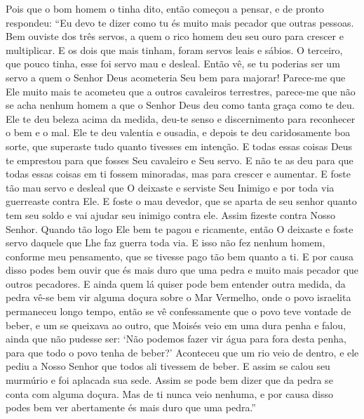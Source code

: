 Pois que o bom homem o tinha dito, então começou a pensar, e de pronto
respondeu: “Eu devo te dizer como tu és muito mais pecador que outras pessoas.
Bem ouviste dos três servos, a quem o rico homem deu seu ouro para crescer e
multiplicar. E os dois que mais tinham, foram servos leais e sábios. O
terceiro, que pouco tinha, esse foi servo mau e desleal. Então vê, se tu
poderias ser um servo a quem o Senhor Deus acometeria Seu bem para majorar!
Parece-me que Ele muito mais te acometeu que a outros cavaleiros terrestres,
parece-me que não se acha nenhum homem a que o Senhor Deus deu como tanta graça
como te deu. Ele te deu beleza acima da medida, deu-te senso e discernimento
para reconhecer o bem e o mal. Ele te deu valentia e ousadia, e depois te deu
caridosamente boa sorte, que superaste tudo quanto tivesses em intenção. 
E todas essas coisas Deus te emprestou para que fosses Seu
cavaleiro e Seu servo. E não te as deu para que todas essas coisas em ti fossem
minoradas, mas para crescer e aumentar. E foste tão mau servo e desleal que O
deixaste e serviste Seu Inimigo e por toda via guerreaste contra Ele. E foste o
mau devedor, que se aparta de seu senhor quanto tem seu soldo e vai ajudar seu
inimigo contra ele. Assim fizeste contra Nosso Senhor. Quando tão logo Ele bem
te pagou e ricamente, então O deixaste e foste servo daquele que Lhe faz guerra
toda via. E isso não fez nenhum homem, conforme meu pensamento, que se tivesse
pago tão bem quanto a ti. E por causa disso podes bem ouvir que és mais duro
que uma pedra e muito mais pecador que outros pecadores. E ainda quem lá quiser
pode bem entender outra medida, da pedra vê-se bem vir alguma doçura sobre o
Mar Vermelho, onde o povo israelita permaneceu longo tempo, então se vê
confessamente que o povo teve vontade de beber, e um se queixava ao outro, que
Moisés veio em uma dura penha e falou, ainda que não pudesse ser: ‘Não podemos
fazer vir água para fora desta penha, para que todo o povo tenha de beber?’
Aconteceu que um rio veio de dentro, e ele pediu a Nosso Senhor que todos ali
tivessem de beber. E assim se calou seu murmúrio e foi aplacada sua sede. Assim
se pode bem dizer que da pedra se conta com alguma doçura. Mas de ti nunca veio
nenhuma, e por causa disso podes bem ver abertamente és mais duro que uma
pedra.” 

